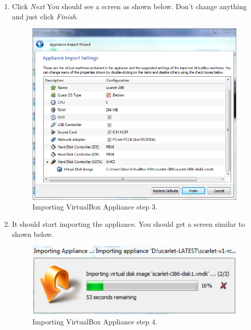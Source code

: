 \documentclass[pdftex,11pt,letterpaper]{article}
\begin{document}
\begin{enumerate}
\item Click \textit{Next} You should see a screen as shown below.  Don't change anything and just click \textit{Finish}.

    \begin{figure}[H]
        \begin{center}
        \leavevmode
            \includegraphics[]{scarlet_images/import_wizard_3.png}
        \end{center}
        \caption{Importing VirtualBox Appliance step 3.}
        \label{fig:import_wizard_3}
    \end{figure}
    
\item It should start importing the appliance.  You should get a screen similar to shown below.

    \begin{figure}[H]
        \begin{center}
        \leavevmode
            \includegraphics[]{scarlet_images/import_wizard_4.png}
        \end{center}
        \caption{Importing VirtualBox Appliance step 4.}
        \label{fig:import_wizard_4}
    \end{figure}
    

\end{enumerate}
\end{document}
